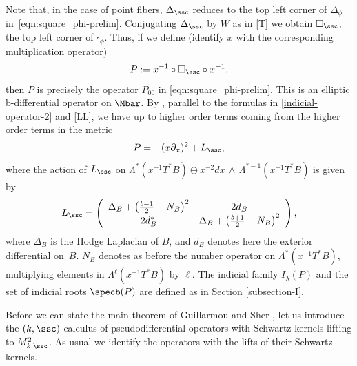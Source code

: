 Note that, in the case of point fibers, $\Delta_{\ssc}$ reduces to the top left corner of $\Delta_{\phi}$ in~\eqref{eqn:square_phi-prelim}. Conjugating $\Delta_{\ssc}$ by $W$ as in \eqref{T} we obtain $\square_{\ssc}$, the top left corner of $\square_\phi$.
Thus, if we define (identify $x$ with the corresponding multiplication operator)
\begin{equation}\label{P-square-relation}
P:= x^{-1} \circ \square_{\ssc} \circ x^{-1}.
\end{equation}
then $P$ is precisely the operator $P_{00}$ in \eqref{eqn:square_phi-prelim}.
This is an elliptic b-differential operator on $\Mbar$. By \cite[(15)]{guillarmou2014low}, parallel to the formulas in
\eqref{indicial-operator-2} and \eqref{LL}, we have up to higher order terms coming from the
higher order terms in the metric
\begin{equation}\label{P00-sc}
P = -(x\partial_x)^{2} + L_{\ssc},
\end{equation}
where the action of $L_{\ssc}$ on $\Lambda^* (x^{-1} T^*B)
\oplus x^{-2} dx \,\wedge \,\Lambda^{*-1} (x^{-1} T^*B)$ is given by
\begin{equation}\label{P00-tangential-sc}
L_{\ssc} = \left(\begin{array}{cc}
\Delta_B + \bigl(\frac{b-1}2-N_B\bigr)^{2} &2d_B \\
2d_B^* & \Delta_B + \bigl(\frac{b+1}2-N_B\bigr)^{2}
\end{array} \right),
\end{equation}
where $\Delta_B$ is the Hodge Laplacian of $B$, and $d_B$ denotes here the exterior
differential on~$B$. $N_B$ denotes as before the number operator on $\Lambda^*(x^{-1} T^*B)$,
multiplying elements in $\Lambda^\ell(x^{-1} T^*B)$ by $\ell$. The indicial family $I_\lambda(P)$
and the set of indicial roots $\specb(P)$ are defined as in Section \ref{subsection-I}.

Before we can state the main theorem of Guillarmou and Sher \cite{guillarmou2014low},
let us introduce the $(k,\ssc)$-calculus of pseudodifferential operators with Schwartz kernels
lifting to $M^{2}_{k, \ssc}$. As usual we identify the operators with the lifts of their Schwartz kernels.

